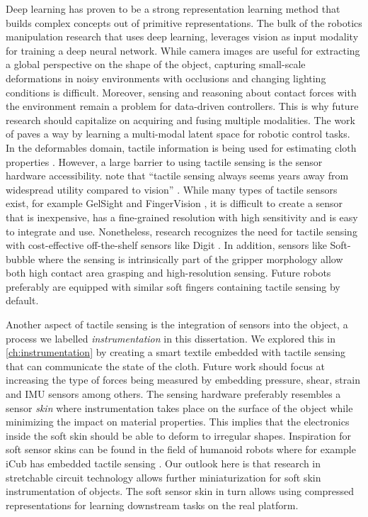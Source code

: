 \documentclass[\home/main.tex]{subfiles}
\begin{document}

Deep learning has proven to be a strong representation learning method that builds complex concepts out of primitive representations. The bulk of the robotics manipulation research that uses deep learning, leverages vision as input modality for training a deep neural network. While camera images are useful for extracting a global perspective on the shape of the object, capturing small-scale deformations in noisy environments with occlusions and changing lighting conditions is difficult. Moreover, sensing and reasoning about contact forces with the environment remain a problem for data-driven controllers. This is why future research should capitalize on acquiring and fusing multiple modalities. The work of \autocite{lee2020making} paves a way by learning a multi-modal latent space for robotic control tasks. In the deformables domain, tactile information is being used for estimating cloth properties \autocite{yuan2018active}. However, a large barrier to using tactile sensing is the sensor hardware accessibility. \citeauthor{Siciliano2008} note that \enquote{tactile sensing always seems years away from widespread utility compared to vision} \autocite{Siciliano2008}. While many types of tactile sensors exist, for example GelSight \autocite{donlon2018gelslim} and FingerVision \autocite{Yamaguchi2017}, it is difficult to create a sensor that is inexpensive, has a fine-grained resolution with high sensitivity and is easy to integrate and use. Nonetheless, research recognizes the need for tactile sensing with cost-effective off-the-shelf sensors like Digit \autocite{digit2020}. In addition, sensors like Soft-bubble \autocite{Alspach2019} where the sensing is intrinsically part of the gripper morphology allow both high contact area grasping and high-resolution sensing. Future robots preferably are equipped with similar soft fingers containing tactile sensing by default. 

Another aspect of tactile sensing is the integration of sensors into the object, a process we labelled \textit{instrumentation} in this dissertation. 
We explored this in \cref{ch:instrumentation} by creating a smart textile embedded with tactile sensing that can communicate the state of the cloth. Future work should focus at increasing the type of forces being measured by embedding pressure, shear, strain and IMU sensors among others. The sensing hardware preferably resembles a sensor \emph{skin} where instrumentation takes place on the surface of the object while minimizing the impact on material properties. This implies that the electronics inside the soft skin should be able to deform to irregular shapes. Inspiration for soft sensor skins can be found in the field of humanoid robots where for example iCub has embedded tactile sensing \autocite{Tomo2018}. Our outlook here is that research in stretchable circuit technology allows further miniaturization for soft skin instrumentation of objects. The soft sensor skin in turn allows using compressed representations for learning downstream tasks on the real platform. 
\end{document}
